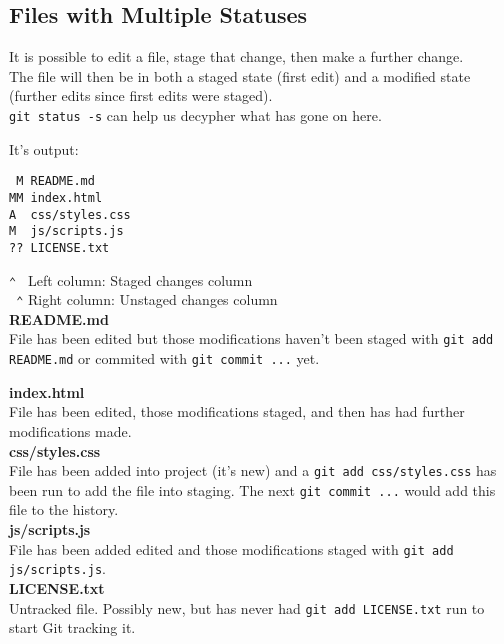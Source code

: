 
\subsection{Files with Multiple Statuses}

It is possible to edit a file, stage that change, then make a further change.
\\

The file will then be in both a staged state (first edit) and a modified state (further edits since first edits were staged).
\\

\texttt{git status -s} can help us decypher what has gone on here.

It's output:

\begin{verbatim}
 M README.md
MM index.html
A  css/styles.css
M  js/scripts.js
?? LICENSE.txt
\end{verbatim}

\texttt{⌃ } Left column: Staged changes column
\\
\texttt{ ⌃} Right column: Unstaged changes column
\\

\textbf{README.md}
\\
File has been edited but those modifications haven't been staged with \texttt{git add README.md} or commited with \texttt{git commit ...} yet.


\textbf{index.html}
\\
File has been edited, those modifications staged, and then has had further modifications made.
\\

\textbf{css/styles.css}
\\
File has been added into project (it's new) and a \texttt{git add css/styles.css} has been run to add the file into staging. The next \texttt{git commit ...} would add this file to the history.
\\

\textbf{js/scripts.js}
\\
File has been added edited and those modifications staged with \texttt{git add js/scripts.js}.
\\

\textbf{LICENSE.txt}
\\
Untracked file. Possibly new, but has never had \texttt{git add LICENSE.txt} run to start Git tracking it.
\\
